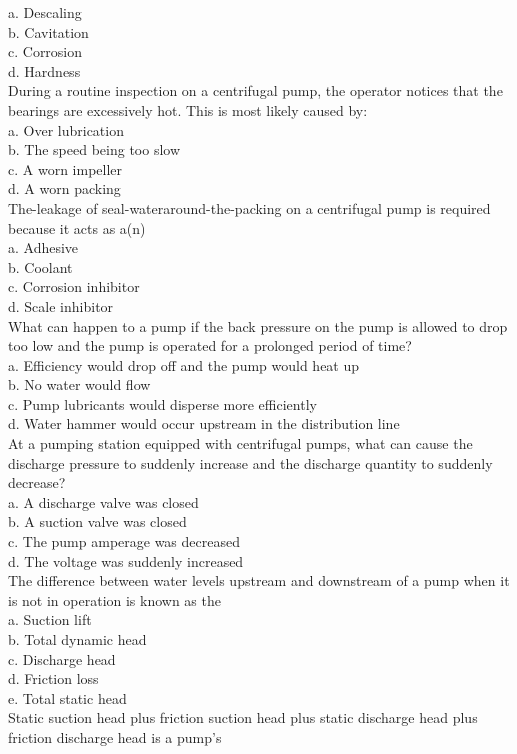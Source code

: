 a.	Descaling\\
b. Cavitation\\
c. Corrosion \\
d. Hardness\\
During a routine inspection on a centrifugal pump, the operator notices that the bearings are excessively hot. This is most likely caused by:\\
a. Over lubrication\\
b. The speed being too slow\\
c. A worn impeller\\
d. A worn packing\\
The-leakage of seal-wateraround-the-packing on a centrifugal pump is required because it acts as a(n)\\
a. Adhesive\\
b. Coolant\\
c. Corrosion inhibitor\\
d. Scale inhibitor\\
What can happen to a pump if the back pressure on the pump is allowed to drop too low and the pump is operated for a prolonged period of time?\\
a. Efficiency would drop off and the pump would heat up\\
b. No water would flow\\
c. Pump lubricants would disperse more efficiently\\
d. Water hammer would occur upstream in the distribution line\\
At a pumping station equipped with centrifugal pumps, what can cause the discharge pressure to suddenly increase and the discharge quantity to suddenly decrease?\\
a. A discharge valve was closed\\
b. A suction valve was closed\\
c. The pump amperage was decreased\\
d. The voltage was suddenly increased\\
The difference between water levels upstream and downstream of a pump when it is not in operation is known as the\\
a. Suction lift\\
b. Total dynamic head\\
c. Discharge head\\
d. Friction loss\\
e. Total static head\\
Static suction head plus friction suction head plus static discharge head plus friction discharge head is a pump's\\
